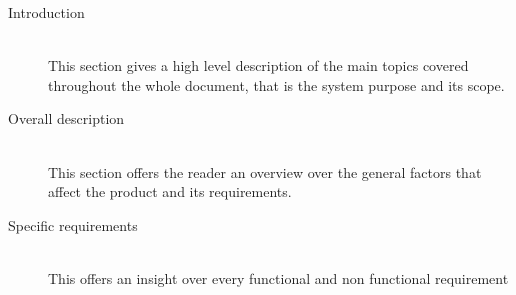 \begin{description}
  \item[Introduction] \hfill \\
  This section gives a high level description of the main topics covered throughout the whole document, that is the system purpose and its scope.
  \item[Overall description] \hfill \\
  This section offers the reader an overview over the general factors that affect the product and its requirements.
  \item[Specific requirements] \hfill \\
  This offers an insight over every functional and non functional requirement
\end{description}